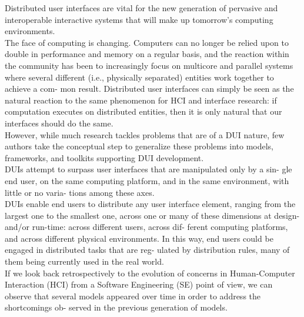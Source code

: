 \cite{elmqvist2011distributed}Distributed user interfaces are vital for the new
generation of pervasive and interoperable interactive systems that will make up tomorrow’s computing environments. \\

\cite{elmqvist2011distributed}The face of computing is changing. Computers can
no longer be relied upon to double in performance and memory on a regular basis, and the reaction within the
community has been to increasingly focus on multicore and parallel systems where
several different (i.e., physically separated) entities work together to achieve
a com- mon result. Distributed user interfaces can simply be seen as the natural
reaction to the same phenomenon for HCI and interface research: if computation
executes on distributed entities, then it is only natural that our interfaces
should do the same. \\

\cite{elmqvist2011distributed}However, while much research tackles problems
that are of a DUI nature, few authors take the conceptual step to generalize these problems into models,
frameworks, and toolkits supporting DUI development. \\

\cite{vanderdonckt2010distributed} DUIs attempt to surpass user interfaces that
are manipulated only by a sin- gle end user, on the same computing platform, and
in the same environment, with little or no varia- tions among these axes.\\

\cite{vanderdonckt2010distributed} DUIs enable end users to distribute any user
interface element, ranging from the largest one to the smallest one, across one
or many of these dimensions at design- and/or run-time: across different users,
across dif- ferent computing platforms, and across different physical environments. In this way, end users could be engaged in distributed tasks that are reg- ulated by distribution rules, many of them being currently used in the real world. \\

\cite{vanderdonckt2010distributed} If we look back retrospectively to the
evolution of concerns in Human-Computer Interaction (HCI) from a Software
Engineering (SE) point of view, we can observe that several models appeared over
time in order to address the shortcomings ob- served in the previous generation of models.\\

